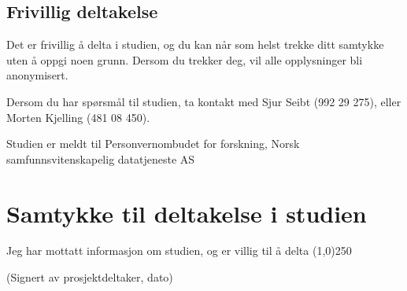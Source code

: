 \documentclass[a4paper,norsk,12pt]{article} %
\begin{document}
\subsection*{Frivillig deltakelse}
Det er frivillig å delta i studien, og du kan når som helst trekke ditt samtykke uten å oppgi noen grunn. Dersom du trekker deg, vil alle opplysninger bli anonymisert. 

Dersom du har spørsmål til studien, ta kontakt med Sjur Seibt (992 29 275), eller Morten Kjelling (481 08 450). 

Studien er meldt til Personvernombudet for forskning, Norsk samfunnsvitenskapelig datatjeneste AS

\section*{Samtykke til deltakelse i studien}
Jeg har mottatt informasjon om studien, og er villig til å delta
\newline\newline\newline\newline
\line(1,0){250}

(Signert av prosjektdeltaker, dato)
\end{document}
